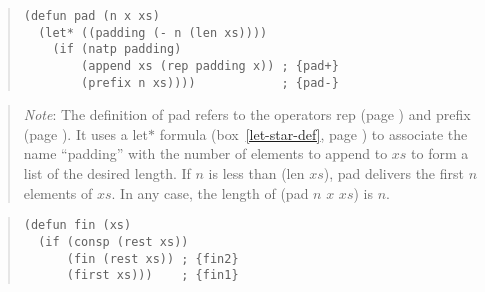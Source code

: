 \begin{exercises}
\begin{samepage}
\label{pad-defun}
\begin{quote}
\begin{code}
\begin{verbatim}
(defun pad (n x xs)
  (let* ((padding (- n (len xs))))
    (if (natp padding)
        (append xs (rep padding x)) ; {pad+}
        (prefix n xs))))            ; {pad-}
\end{verbatim}
\end{code}
\end{quote}
\end{samepage}
\begin{quote}
\emph{Note}: The definition of \textsf{pad} refers to the operators
\textsf{rep} (page \pageref{rep-equations}) and \textsf{prefix} (page \pageref{prefix-equations}).
It uses a \textsf{let$*$} formula (box~\ref{let-star-def}, page \pageref{let-star-def})
to associate the name ``\textsf{padding}'' with the number of elements to append to $xs$
to form a list of the desired length. If $n$ is less than \textsf{(len $xs$)},
\textsf{pad} delivers the first $n$ elements of $xs$. In any case, the length of
\textsf{(pad $n$ $x$ $xs$)} is $n$.
\end{quote}

\label{fin-defun}
\begin{quote}
\begin{code}
\begin{verbatim}
(defun fin (xs)
  (if (consp (rest xs))
      (fin (rest xs)) ; {fin2}
      (first xs)))    ; {fin1}
\end{verbatim}
\end{code}
\end{quote}


\end{exercises}
